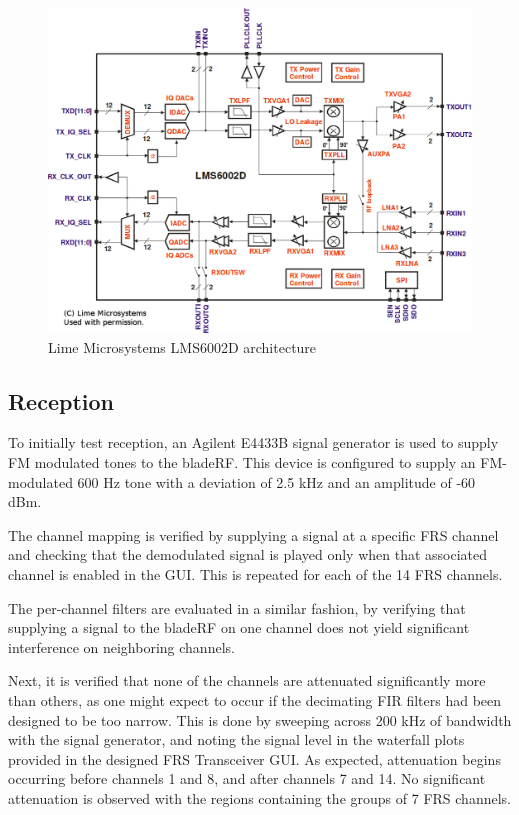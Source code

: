 \begin{figure}[H]
  \centering
  \includegraphics[width=5in]{images/lms6002d_block_diagram.png}
  \caption{Lime Microsystems LMS6002D architecture}
  \label{fig:lms6002d_architecture}
\end{figure}

\subsection{Reception}
To initially test reception, an Agilent E4433B signal generator \cite{SIGGEN}
is used to supply FM modulated tones to the bladeRF. This device is configured
to supply an FM-modulated 600 Hz tone with a deviation of 2.5 kHz and an
amplitude of -60 dBm.

The channel mapping is verified by supplying a signal at a specific \ac{FRS}
channel and checking that the demodulated signal is played only when that
associated channel is enabled in the \ac{GUI}. This is repeated for each of the 14
\ac{FRS} channels.

The per-channel filters are evaluated in a similar fashion, by verifying that
supplying a signal to the bladeRF on one channel does not yield significant
interference on neighboring channels.

Next, it is verified that none of the channels are attenuated significantly
more than others, as one might expect to occur if the decimating \ac{FIR}
filters had been designed to be too narrow. This is done by sweeping across
200 kHz of bandwidth with the signal generator, and noting the signal level
in the waterfall plots provided in the designed \ac{FRS} Transceiver \ac{GUI}. As
expected, attenuation begins occurring before channels 1 and 8, and after
channels 7 and 14. No significant attenuation is observed with the regions
containing the groups of 7 \ac{FRS} channels.

